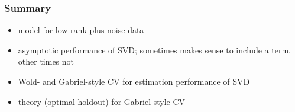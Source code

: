 \documentclass{beamer}
\begin{document}
\begin{frame}
  \frametitle{Summary}
  \begin{itemize}
    \item model for low-rank plus noise data
    \item asymptotic performance of SVD; sometimes makes sense to include a term, other times not
    \item Wold- and Gabriel-style CV for estimation performance of SVD
    \item theory (optimal holdout) for Gabriel-style CV 
  \end{itemize}
\end{frame}
\end{document}
